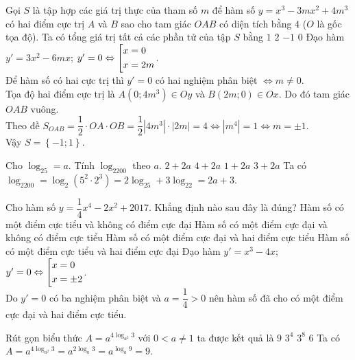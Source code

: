\begin{ex}%
	Gọi $S$ là tập hợp các giá trị thực của tham số $m$ để hàm số $y=x^3-3mx^2+4m^3$ có hai điểm cực trị $A$ và $B$ sao cho tam giác $OAB$ có diện tích bằng $4$ ($O$ là gốc tọa độ). Ta có tổng giá trị tất cả các phần tử của tập $S$ bằng
	\choice
	{$1$}
	{$2$}
	{$-1$}
	{\True $0$}
	\loigiai
	{Đạo hàm $y'=3x^2-6mx$; $y'=0\Leftrightarrow\left[\begin{aligned}&x=0\\&x=2m\end{aligned}\right.$.\\
		Để hàm số có hai cực trị thì $y'=0$ có hai nghiệm phân biệt $\Leftrightarrow m\neq 0$.\\
		Tọa độ hai điểm cực trị là $A\left(0; 4m^3\right)\in Oy$ và $B\left(2m; 0\right)\in Ox$. Do đó tam giác $OAB$ vuông.\\
		Theo đề $S_{OAB}=\dfrac{1}{2}\cdot OA\cdot OB=\dfrac{1}{2}\left|4m^3\right|\cdot\left|2m\right|=4\Leftrightarrow \left|m^4\right|=1\Leftrightarrow m=\pm 1$.\\
		Vậy $S=\left\{-1; 1\right\}$.
	}
\end{ex}

\begin{ex}%
	Cho $\log_25=a$. Tính $\log_2200$ theo $a$.
	\choice
	{$2+2a$}
	{$4+2a$}
	{$1+2a$}
	{\True $3+2a$}
	\loigiai
	{Ta có $\log_2200=\log_2\left(5^2\cdot 2^3\right)=2\log_25+3\log_22=2a+3$.}
\end{ex}

\begin{ex}%
	Cho hàm số $y=\dfrac{1}{4}x^4-2x^2+2017$. Khẳng định nào sau đây là đúng?
	\choice
	{Hàm số có một điểm cực tiểu và không có điểm cực đại}
	{Hàm số có một điểm cực đại và không có điểm cực tiểu}
	{\True Hàm số có một điểm cực đại và hai điểm cực tiểu}
	{Hàm số có một điểm cực tiểu và hai điểm cực đại}
	\loigiai
	{Đạo hàm $y'=x^3-4x$; $y'=0\Leftrightarrow\left[\begin{aligned}&x=0\\&x=\pm 2\end{aligned}\right.$.\\
		Do $y'=0$ có ba nghiệm phân biệt và $a=\dfrac{1}{4}>0$ nên hàm số đã cho có một điểm cực đại và hai điểm cực tiểu.}
\end{ex}

\begin{ex}%
	Rút gọn biểu thức $A=a^{4\log_{a^2}3}$ với $0<a\neq 1$ ta được kết quả là
	\choice
	{\True $9$}
	{$3^4$}
	{$3^8$}
	{$6$}
	\loigiai
	{Ta có $A=a^{4\log_{a^2}3}=a^{2\log_a3}=a^{\log_a9}=9$.}
\end{ex}

